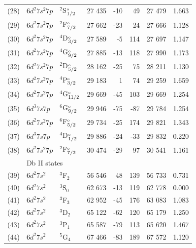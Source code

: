 \documentclass[10pt,a4paper, twoside, openright]{report}
\begin{document}
{\begin{longtable}{cllrrrrr}
(28)   &  $6d^2 7s^2 7p$  &  $^2$S$^{\rm_o}_{1/2}$ &    27 435 & -10   &  49 & 27 479 & 1.663 \\ 
(29)  &   $6d^2 7s^2 7p$  &  $^2$F$^{\rm_o}_{7/2}$ &    27 662 & -23   & 24  & 27 666 & 1.128  \\ 
(30)  &  $6d^2 7s^2 7p$  &  $^4$D$^{\rm_o}_{3/2}$ &    27 589 & -5   & 114 & 27 697  & 1.147 \\ 
(31)  &  $6d^2 7s^2 7p$  &  $^4$G$^{\rm_o}_{9/2}$ &    27 885 & -13   &  118 & 27 990 & 1.173 \\ 
(32)   & $6d^2 7s^2 7p$  &  $^2$D$^{\rm_o}_{5/2}$ &    28 162 & -25  & 75 & 28 211  & 1.130 \\ 
(33)    &  $6d^2 7s^2 7p$  &  $^4$P$^{\rm_o}_{3/2}$ &    29 183 & 1  & 74 & 29 259 & 1.659 \\ 
(34)  & $6d^2 7s^2 7p$  &  $^4$G$^{\rm_o}_{11/2}$ &    29 669 & -45 & 103 & 29 669 & 1.254 \\ 
(35)  & $6d^3 7s 7p$  &  $^6$G$^{\rm_o}_{9/2}$ &    29 946 & -75  & -87 & 29 784 & 1.254 \\ 
(36)  &   $6d^2 7s^2 7p$  &  $^6$F$^{\rm_o}_{5/2}$   &  29 734 &  -25  & 174  & 29 821 & 1.343 \\ 
(37) &  $6d^3 7s 7p$  &  $^4$D$^{\rm_o}_{1/2}$  &  29 886 & -24  &  -33  & 29 832 & 0.220 \\ 
(38)  &  $6d^2 7s^2 7p$  &  $^2$F$^{\rm_o}_{7/2}$   &  30 474 & -29  & 97 & 30 541  & 1.161 \\ 
 & \multicolumn{5}{l}{Db II states} \\
(39)  &   $6d^2 7s^2$  &  $^3$F$_2$  & 56 546 & 48 & 139 & 56 733 & 0.731 \\ 
(40)  &   $6d^2 7s^2$  &  $^3$S$_0$  & 62 673 & -13 & 119 & 62 778 & 0.000 \\ 
(41)  &   $6d^2 7s^2$  &  $^3$F$_3$ & 62 952 & -45 & 176 & 63 083 & 1.083 \\ 
(42)  &   $6d^2 7s^2$  &  $^3$D$_2$  & 65 122 & -62 & 120 & 65 179 & 1.250 \\ 
(43)  &   $6d^2 7s^2$  &  $^3$P$_1$  & 65 587 & -79 & 113 & 65 620 & 1.467 \\ 
(44)  &   $6d^2 7s^2$  &  $^5$G$_4$  & 67 466 & -83 & 189 & 67 572 & 1.120 \\ 
\bottomrule 
 \bottomrule 
\end{longtable} 
}
\end{document}
